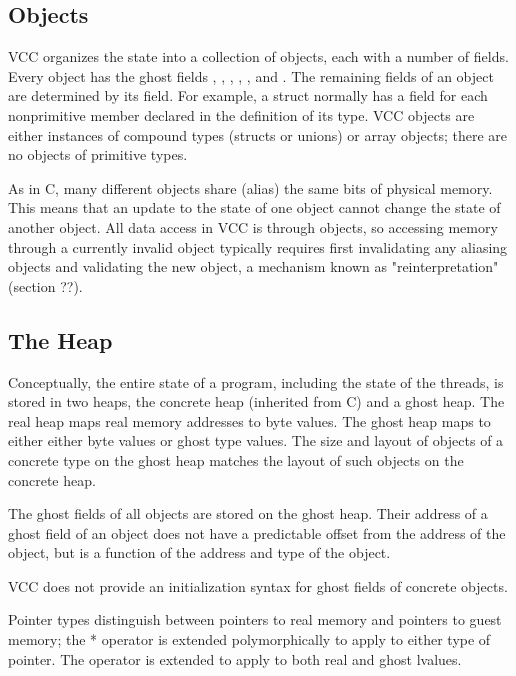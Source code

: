 \documentclass[preprint,nocopyrightspace]{sigplanconf}
\begin{document}
{\subsection{Objects}
VCC organizes the state into a collection of objects, each with
a number of fields. Every object has the ghost
fields \vcc{\owner}, \vcc{\owns}, \vcc{\closed}, \vcc{\type}, \vcc{\valid},
and \vcc{\version}. The remaining fields of an object are determined
by its \vcc{\type} field. For example, a struct normally has a field
for each nonprimitive member declared in the definition of its
type. VCC objects are either instances of compound types (structs or
unions) or array objects; there are no objects of primitive types. 

As in C, many different objects share (alias) the same bits of
physical memory. This means that an update to the state of
one \vcc{\valid} object cannot change the state of
another \vcc{\valid} object. All data access in VCC is
through \vcc{\valid} objects, so accessing memory through a currently
invalid object typically requires first invalidating any aliasing
objects and validating the new object, a mechanism known as
"reinterpretation" (section ??). 

\subsection{The Heap}

Conceptually, the entire state of a program, including the state of
the threads, is stored in two heaps, the concrete heap (inherited from
C) and a ghost heap. The real heap maps real memory addresses to byte
values. The ghost heap maps \vcc{\natural} to either either byte
values or ghost type values. 
The size and layout of objects of a concrete type on the ghost heap
matches the layout of such objects on the concrete heap.  

The ghost fields of all objects are stored on the ghost heap. Their
address of a ghost field of an object does not have a predictable
offset from the address of the object, but is a function of the
address and type of the object.  

VCC does not provide an initialization syntax for ghost fields of concrete objects. 

Pointer types distinguish between pointers to real memory and pointers
to guest memory; the * operator is extended polymorphically to apply
to either type of pointer. The \vcc{&} operator is extended to apply
to both real and ghost lvalues. 

}
\end{document}
